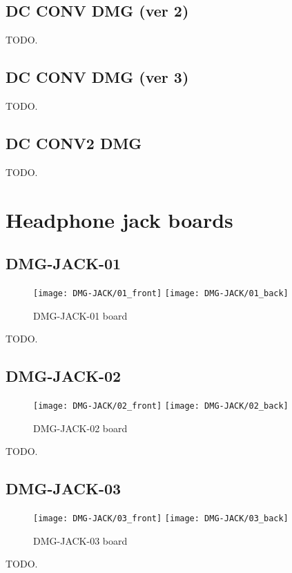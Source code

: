 \subsection{DC CONV DMG (ver 2)}

TODO.

\subsection{DC CONV DMG (ver 3)}

TODO.

\subsection{DC CONV2 DMG}

TODO.

\section{Headphone jack boards}

\subsection{DMG-JACK-01}

\begin{figure}[H]
  \centering
  \texttt{[image: DMG-JACK/01\_front]}
  \texttt{[image: DMG-JACK/01\_back]}
  \caption{DMG-JACK-01 board}
\end{figure}

TODO.

\subsection{DMG-JACK-02}

\begin{figure}[H]
  \centering
  \texttt{[image: DMG-JACK/02\_front]}
  \texttt{[image: DMG-JACK/02\_back]}
  \caption{DMG-JACK-02 board}
\end{figure}

TODO.

\subsection{DMG-JACK-03}

\begin{figure}[H]
  \centering
  \texttt{[image: DMG-JACK/03\_front]}
  \texttt{[image: DMG-JACK/03\_back]}
  \caption{DMG-JACK-03 board}
\end{figure}

TODO.
